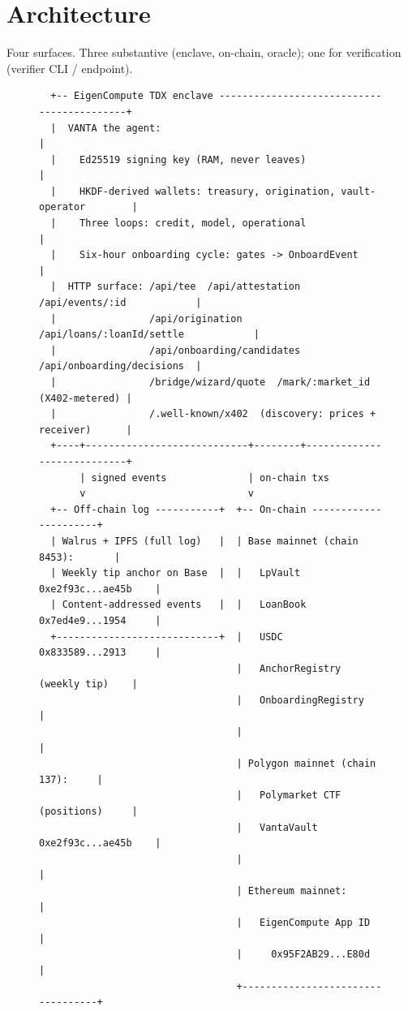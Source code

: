 \documentclass[11pt,letterpaper]{article}
\begin{document}
\section{Architecture}
\label{sec:arch}

Four surfaces. Three substantive (enclave, on-chain, oracle); one for verification (verifier CLI / endpoint).

\begin{figure}[h]
\centering
\begin{minipage}{0.96\textwidth}
\small\ttfamily
\begin{verbatim}
  +-- EigenCompute TDX enclave -------------------------------------------+
  |  VANTA the agent:                                                     |
  |    Ed25519 signing key (RAM, never leaves)                            |
  |    HKDF-derived wallets: treasury, origination, vault-operator        |
  |    Three loops: credit, model, operational                            |
  |    Six-hour onboarding cycle: gates -> OnboardEvent                   |
  |  HTTP surface: /api/tee  /api/attestation  /api/events/:id            |
  |                /api/origination  /api/loans/:loanId/settle            |
  |                /api/onboarding/candidates  /api/onboarding/decisions  |
  |                /bridge/wizard/quote  /mark/:market_id  (X402-metered) |
  |                /.well-known/x402  (discovery: prices + receiver)      |
  +----+----------------------------+--------+----------------------------+
       | signed events              | on-chain txs
       v                            v
  +-- Off-chain log -----------+  +-- On-chain ----------------------+
  | Walrus + IPFS (full log)   |  | Base mainnet (chain 8453):       |
  | Weekly tip anchor on Base  |  |   LpVault    0xe2f93c...ae45b    |
  | Content-addressed events   |  |   LoanBook   0x7ed4e9...1954     |
  +----------------------------+  |   USDC       0x833589...2913     |
                                  |   AnchorRegistry (weekly tip)    |
                                  |   OnboardingRegistry             |
                                  |                                  |
                                  | Polygon mainnet (chain 137):     |
                                  |   Polymarket CTF (positions)     |
                                  |   VantaVault 0xe2f93c...ae45b    |
                                  |                                  |
                                  | Ethereum mainnet:                |
                                  |   EigenCompute App ID            |
                                  |     0x95F2AB29...E80d            |
                                  +----------------------------------+


\end{verbatim}
\end{minipage}
\end{figure}
\end{document}
